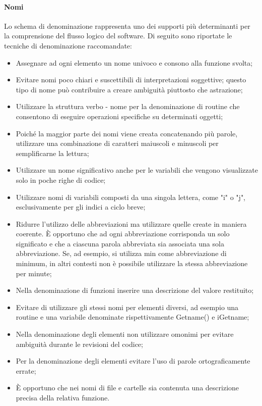 \documentclass[../NormeDiProgetto.tex]{subfiles}
\begin{document}
                  \paragraph{Nomi}
                  Lo schema di denominazione rappresenta uno dei supporti più determinanti per la comprensione del flusso logico del software. Di seguito sono riportate le tecniche di denominazione raccomandate:
                  \begin{itemize}
                        \item Assegnare ad ogni elemento un nome univoco e consono alla funzione svolta;
                        \item Evitare nomi poco chiari e suscettibili di interpretazioni soggettive; questo tipo di nome può contribuire a creare ambiguità piuttosto che astrazione;
                        \item Utilizzare la struttura verbo - nome per la denominazione di routine che consentono di eseguire operazioni specifiche su determinati oggetti;
                        \item Poiché la maggior parte dei nomi viene creata concatenando più parole, utilizzare una combinazione di caratteri maiuscoli e minuscoli per semplificarne la lettura;
                        \item Utilizzare un nome significativo anche per le variabili che vengono visualizzate solo in poche righe di codice;
                        \item Utilizzare nomi di variabili composti da una singola lettera, come "i" o "j", esclusivamente per gli indici a ciclo breve;
                        \item Ridurre l'utilizzo delle abbreviazioni ma utilizzare quelle create in maniera coerente. È opportuno che ad ogni abbreviazione corrisponda un solo significato e che a ciascuna parola abbreviata sia associata una sola abbreviazione. Se, ad esempio, si utilizza min come abbreviazione di minimum, in altri contesti non è possibile utilizzare la stessa abbreviazione per minute;
                        \item Nella denominazione di funzioni inserire una descrizione del valore restituito;
                        \item Evitare di utilizzare gli stessi nomi per elementi diversi, ad esempio una routine e una variabile denominate rispettivamente Getname() e iGetname;
                        \item Nella denominazione degli elementi non utilizzare omonimi per evitare ambiguità durante le revisioni del codice;
                        \item Per la denominazione degli elementi evitare l'uso di parole ortograficamente errate;
                        \item È opportuno che nei nomi di file e cartelle sia contenuta una descrizione precisa della relativa funzione.
                  \end{itemize}
\end{document}
